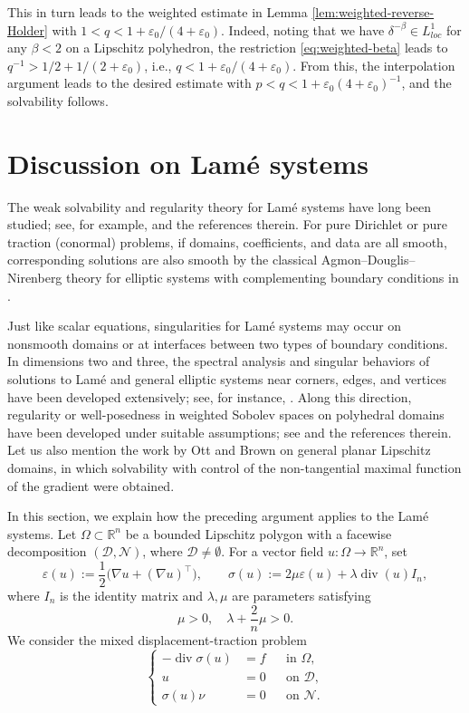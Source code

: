 \documentclass[12pt]{amsart}
\numberwithin{equation}{section}
\newcommand{\bR}{\mathbb{R}}
\newcommand\cD{\mathcal{D}}
\newcommand\cN{\mathcal{N}}
\newcommand{\epsi}{\varepsilon}
\begin{document}
This in turn leads to the weighted estimate in Lemma \ref{lem:weighted-reverse-Holder} with $1<q<1 + \epsi_0/(4+\epsi_0)$. Indeed, noting that we have $\delta^{-\beta} \in L^1_{loc}$ for any $\beta < 2$ on a Lipschitz polyhedron, the restriction \eqref{eq:weighted-beta} leads to $q^{-1} > 1/2 + 1/(2+\epsi_0)$, i.e., $q < 1 + \epsi_0/(4+\epsi_0)$.
From this, the interpolation argument leads to the desired estimate with $p < q < 1 + \epsi_0 (4+\epsi_0)^{-1}$, and the solvability follows.


\section{Discussion on Lam\'e systems}
\label{sec:lame}

The weak solvability and regularity theory for Lam\'e systems have long been studied; see, for example, \cite[Section~6.3]{MR936420} and the references therein. For pure Dirichlet or pure traction (conormal) problems, if domains, coefficients, and data are all smooth, corresponding solutions are also smooth by the classical Agmon--Douglis--Nirenberg theory for elliptic systems with complementing boundary conditions in \cite{MR162050}. 

Just like scalar equations, singularities for Lam\'e systems may occur on nonsmooth domains or at interfaces between two types of boundary conditions. In dimensions two and three, the spectral analysis and singular behaviors of solutions to Lam\'e and general elliptic systems near corners, edges, and vertices have been developed extensively; see, for instance, \cite{MR996909,MR1006837,MR1205404,MR1147281}.
Along this direction, regularity or well-posedness in weighted Sobolev spaces on polyhedral domains have been developed under suitable assumptions; see \cite{MR2564468} and the references therein. Let us also mention the work by Ott and Brown \cite{MR3040944} on general planar Lipschitz domains, in which solvability with control of the non-tangential maximal function of the gradient were obtained.


In this section, we explain how the preceding argument applies to the Lam\'e systems. 
Let $\Omega\subset\bR^n$ be a bounded Lipschitz polygon with a facewise decomposition $(\cD,\cN)$, where $\cD\neq\emptyset$. For a vector field $u:\Omega\to\bR^n$, set
\[
 \epsi(u):=\frac12\bigl(\nabla u+(\nabla u)^\top\bigr),
 \qquad
 \sigma(u):=2\mu\varepsilon(u)+\lambda\operatorname{div}(u)I_n,
\]
where $I_n$ is the identity matrix and $\lambda, \mu$ are parameters satisfying
\begin{equation} \label{eqn-lame-coeff}
    \mu > 0,
    \quad
    \lambda + \frac{2}{n} \mu > 0.
\end{equation}
We consider the mixed displacement-traction problem
\begin{equation}
 \left\{
 \begin{aligned}
  -\operatorname{div}\sigma(u)&=f &&\text{in }\Omega,\\
  u&=0 &&\text{on }\cD,\\
  \sigma(u)\nu&=0 &&\text{on }\cN.
 \end{aligned}
 \right.
 \tag{$\mathrm L$}
 \label{prob:lame}
\end{equation}
\end{document}
